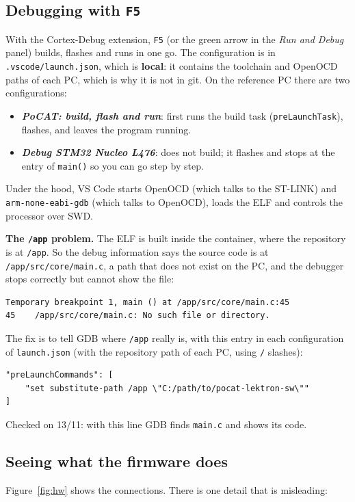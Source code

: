 \documentclass[11pt,a4paper]{article}
\DeclareRobustCommand{\_}{\textunderscore\allowbreak}
\newcommand{\cd}[1]{\texttt{#1}}
\begin{document}
\subsection{Debugging with \texorpdfstring{\cd{F5}}{F5}}

With the Cortex-Debug extension, \cd{F5} (or the green arrow in the \emph{Run and Debug} panel)
builds, flashes and runs in one go. The configuration is in \cd{.vscode/launch.json}, which
is \textbf{local}: it contains the toolchain and OpenOCD paths of each PC, which is why it is not in
git. On the reference PC there are two configurations:
\begin{itemize}
\item \textbf{\emph{PoCAT: build, flash and run}}: first runs the build task
  (\cd{preLaunchTask}), flashes, and leaves the program running.
\item \textbf{\emph{Debug STM32 Nucleo L476}}: does not build; it flashes and stops at the entry of
  \cd{main()} so you can go step by step.
\end{itemize}

Under the hood, VS Code starts OpenOCD (which talks to the ST-LINK) and \cd{arm-none-eabi-gdb} (which
talks to OpenOCD), loads the ELF and controls the processor over SWD.

\textbf{The \cd{/app} problem.} The ELF is built inside the container, where the repository is at
\cd{/app}. So the debug information says the source code is at
\cd{/app/src/core/main.c}, a path that does not exist on the PC, and the debugger stops correctly but
cannot show the file:
\begin{lstlisting}[style=out]
Temporary breakpoint 1, main () at /app/src/core/main.c:45
45    /app/src/core/main.c: No such file or directory.
\end{lstlisting}
The fix is to tell GDB where \cd{/app} really is, with this entry in each
configuration of \cd{launch.json} (with the repository path of each PC, using \cd{/} slashes):
\begin{lstlisting}
"preLaunchCommands": [
    "set substitute-path /app \"C:/path/to/pocat-lektron-sw\""
]
\end{lstlisting}
Checked on 13/11: with this line GDB finds \cd{main.c} and shows its code.

\subsection{Seeing what the firmware does}

Figure~\ref{fig:hw} shows the connections. There is one detail that is misleading:
\end{document}

